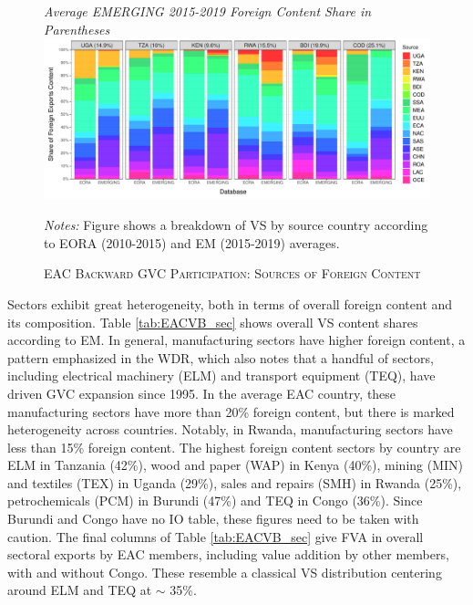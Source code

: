 \documentclass[a4paper]{article}
\begin{document}
\begin{figure}[h!]
\centering
\caption{\label{fig:EACVB_ctry}\textsc{EAC Backward GVC Participation: Sources of Foreign Content}}
\small{\textit{Average EMERGING 2015-2019 Foreign Content Share in Parentheses}}
\vspace{2mm}
\includegraphics[width=1\textwidth, trim= {0 2mm 0 0}, clip]{"Figures/VA_shares_ctry.pdf"} \\ \raggedright
\scriptsize
\vspace{-2mm}
\emph{Notes:} Figure shows a breakdown of VS by source country according to EORA (2010-2015) and EM (2015-2019) averages. 
\end{figure}
\FloatBarrier

Sectors exhibit great heterogeneity, both in terms of overall foreign content and its composition. Table \ref{tab:EACVB_sec} shows overall VS content shares according to EM. In general, manufacturing sectors have higher foreign content, a pattern emphasized in the WDR, which also notes that a handful of sectors, including electrical machinery (ELM) and transport equipment (TEQ), have driven GVC expansion since 1995. In the average EAC country, these manufacturing sectors have more than 20\% foreign content, but there is marked heterogeneity across countries. Notably, in Rwanda, manufacturing sectors have less than 15\% foreign content. The highest foreign content sectors by country are ELM in Tanzania (42\%), wood and paper (WAP) in Kenya (40\%), mining (MIN) and textiles (TEX) in Uganda (29\%), sales and repairs (SMH) in Rwanda (25\%), petrochemicals (PCM) in Burundi (47\%) and TEQ in Congo (36\%). Since Burundi and Congo have no IO table, these figures need to be taken with caution. The final columns of Table \ref{tab:EACVB_sec} give FVA in overall sectoral exports by EAC members, including value addition by other members, with and without Congo. These resemble a classical VS distribution centering around ELM and TEQ at $\sim$ 35\%. \newline
\end{document}
